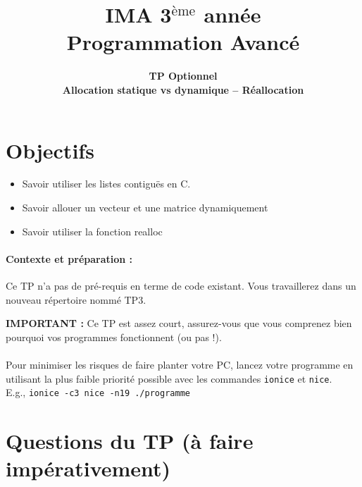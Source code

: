 \documentclass[final, pdftex, a4paper, openbib, ]{article}
\title{IMA 3$^{\mbox{\`eme}}$ année\\ Programmation Avancé
}
\author{\huge \textbf{TP Optionnel} \\ \huge \textbf{Allocation statique vs dynamique -- Réallocation}
}
\date{}
\begin{document}
\posttitle{\par\end{center}}
\setlength{\droptitle}{-45pt}
\maketitle

\vspace{-1.7cm}
\section{Objectifs}

\begin{itemize}
	\item Savoir utiliser les listes contiguës en C.
	\item Savoir allouer un vecteur et une matrice dynamiquement
	\item Savoir utiliser la fonction realloc
\end{itemize}


\paragraph{Contexte et préparation : } Ce TP n'a pas de pré-requis en terme de code existant. Vous travaillerez dans un nouveau répertoire nommé TP3.


\begin{alertinfo}{}
	\textbf{IMPORTANT :} Ce TP est assez court, assurez-vous que vous comprenez bien pourquoi vos programmes
	fonctionnent (ou pas !).\\ \\
	Pour minimiser les risques de faire planter votre PC, lancez votre programme en utilisant la plus faible priorité possible avec les commandes \texttt{ionice} et \texttt{nice}.\\
	E.g., \texttt{ionice -c3 nice -n19 ./programme}
\end{alertinfo}


\section{Questions du TP \large (à faire impérativement)}
\end{document}
